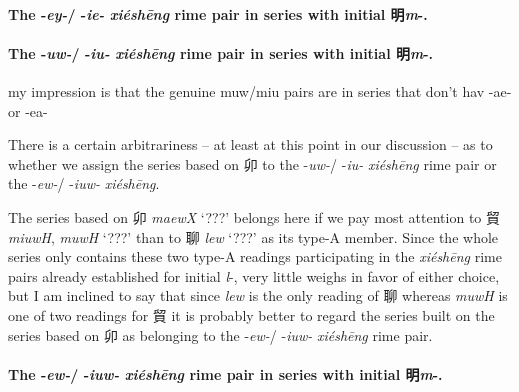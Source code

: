 \paragraph{The -\textit{ey-}/ -\textit{ie-} \textit{xiéshēng} rime pair in series with initial 明\textit{m}-.}

\paragraph{The -\textit{uw-}/ -\textit{iu-} \textit{xiéshēng} rime pair in series with initial 明\textit{m}-.}

my impression is that the genuine muw/miu pairs are in series that don't hav -ae- or -ea- 

There is a certain arbitrariness -- at least at this point in our discussion -- as to whether we assign the series based on 
卯 to the -\textit{uw-}/ -\textit{iu-} \textit{xiéshēng} rime pair or the -\textit{ew-}/ -\textit{iuw-} \textit{xiéshēng}. 

The series based on 
卯 %
\textit{maewX} `???' belongs here if we pay most attention to 
貿 %
    \textit{miuwH}, \textit{muwH} `???' %
than to 
聊 %
\textit{lew} `???' %
as its  type-A member. Since the whole series only contains these two type-A readings participating in the \textit{xiéshēng} rime pairs already established for initial \textit{l}-, very little weighs in favor of either choice, but I am inclined to say that since  \textit{lew} is the only reading of 
聊 %
whereas 
\textit{muwH} is one of two readings for 
貿 %
it is probably better to regard the series built on 
 the series based on 
卯 as belonging to the -\textit{ew-}/ -\textit{iuw-} \textit{xiéshēng} rime pair.  


\paragraph{The -\textit{ew-}/ -\textit{iuw-} \textit{xiéshēng} rime pair in series with initial 明\textit{m}-.}



